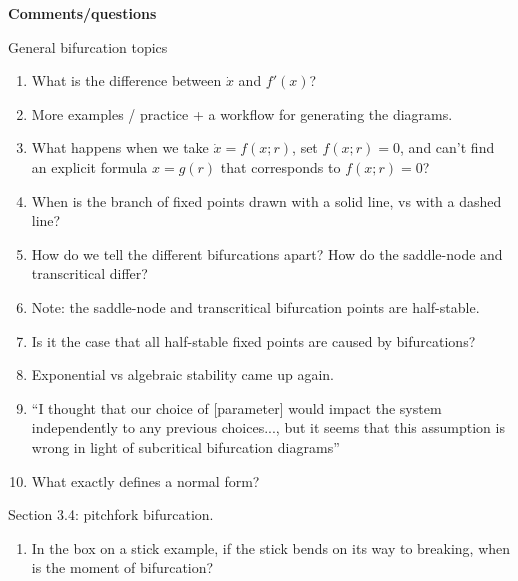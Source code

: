 \documentclass[12pt,letterpaper,noanswers]{exam}
\begin{document}
\noindent\textbf{Comments/questions}

General bifurcation topics
\begin{enumerate}
\itemsep-0.2em
\item What is the difference between $\dot x$ and $f'(x)$?
\item More examples / practice + a workflow for generating the diagrams.
\item What happens when we take $\dot{x} = f(x; r)$, set $f(x; r) = 0$, and can't find an explicit formula $x = g(r)$ that corresponds to $f(x; r) = 0$?
\item When is the branch of fixed points drawn with a solid line, vs with a dashed line?
\item How do we tell the different bifurcations apart?  How do the saddle-node and transcritical differ?
\item Note: the saddle-node and transcritical bifurcation points are half-stable.
\item Is it the case that all half-stable fixed points are caused by bifurcations?  
\item Exponential vs algebraic stability came up again.
\item ``I thought that our choice of [parameter] would impact the system independently to any previous choices..., but it seems that this assumption is wrong in light of subcritical bifurcation diagrams''
\item What exactly defines a normal form?
\end{enumerate}

%

Section 3.4: pitchfork bifurcation.
\begin{enumerate}
\itemsep-0.2em
 \item In the box on a stick example, if the stick bends on its way to breaking, when is the moment of bifurcation?
 
\end{enumerate}
\end{document}
